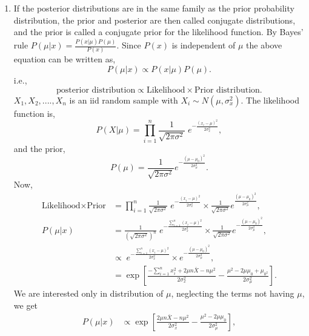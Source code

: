 \documentclass[a4paper,english,12pt]{article}
\begin{document}
\begin{enumerate}[label=(\alph*).]
\item If the posterior distributions are in the same family as the prior probability distribution, the prior and posterior are then called conjugate distributions, and the prior is called a conjugate prior for the likelihood function. By Bayes' rule $P(\mu | x) = \frac{P(x| \mu)P(\mu)}{P(x)}$. Since $P(x)$ is independent of $\mu$ the above equation can be written as,
\begin{equation*}
P(\mu | x) \propto P(x| \mu)P(\mu).
\end{equation*}
i.e., 
\begin{equation*}
\mbox{posterior distribution} \propto \mbox{Likelihood} \times \mbox{Prior distribution}.
\end{equation*}
$X_1,X_2,....,X_n$ is an iid random sample with $X_i \sim N(\mu,\sigma_{x}^{2})$. The likelihood function is,
\begin{equation*}
P(X | \mu) = \prod_{i=1}^{n} \frac{1}{\sqrt{2\pi \sigma^{2}}} \;e^{-\frac{(x_{i}-\mu)^{2}}{2\sigma_{x}^{2}}},
\end{equation*}
and the prior,
\begin{equation*}
P(\mu) = \frac{1}{\sqrt{2\pi \sigma^{2}}} e^{-\frac{(\mu-\mu_{0})^{2}}{2\sigma_{\mu}^{2}}}.
\end{equation*}
Now,
\begin{align*}
\mbox{Likelihood} \times \mbox{Prior} &= \prod_{i=1}^{n} \frac{1}{\sqrt{2\pi \sigma^{2}}} \;e^{-\frac{(x_{i}-\mu)^{2}}{2\sigma_{x}^{2}}} \times \frac{1}{\sqrt{2\pi \sigma^{2}}} e^{\frac{(\mu-\mu_{0})^{2}}{2\sigma_{\mu}^{2}}},\\
P(\mu | x)&= \frac{1}{(\sqrt{2\pi \sigma^{2}})^{n}} \;e^{-\frac{\sum_{i=1}^{n}(x_{i}-\mu)^{2}}{2\sigma_{x}^{2}}} \times \frac{1}{\sqrt{2\pi \sigma^{2}}} e^{-\frac{(\mu-\mu_{0})^{2}}{2\sigma_{\mu}^{2}}},\\
&\propto \;e^{-\frac{\sum_{i=1}^{n}(x_{i}-\mu)^{2}}{2\sigma_{x}^{2}}} \times e^{-\frac{(\mu-\mu_{0})^{2}}{2\sigma_{\mu}^{2}}},\\
&=\exp\left[{\frac{-\sum_{i=1}^{n}x_{i}^{2}+2\mu n \bar X-n\mu^{2}}{2\sigma_{x}^{2}}}-\frac{\mu^{2} - 2\mu \mu_{0}+\mu_{0^{2}}}{2\sigma_{\mu}^{2}}\right].
\end{align*}
We are interested only in distribution of $\mu$, neglecting the terms not having $\mu$, we get
\begin{align*}
P(\mu | x)&\propto \exp\left[\frac{2\mu n\bar X -n\mu^{2}}{2\sigma_{x}^{2}} - \frac{\mu^{2} - 2\mu \mu_{0}}{2\sigma_{\mu}^{2}}\right],\\

\end{align*}
\end{enumerate}
\end{document}
